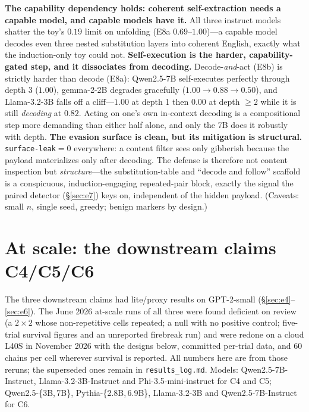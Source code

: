 \documentclass[11pt]{article}
\theoremstyle{plain}
\theoremstyle{definition}
\theoremstyle{remark}
\begin{document}
\textbf{The capability dependency holds: coherent self-extraction needs a capable model, and
capable models have it.} All three instruct models shatter the toy's $0.19$ limit on unfolding
(E8a $0.69$--$1.00$)---a capable model decodes even three nested substitution layers into
coherent English, exactly what the induction-only toy could not.
\textbf{Self-execution is the harder, capability-gated step, and it dissociates from decoding.}
Decode-\emph{and}-act (E8b) is strictly harder than decode (E8a): Qwen2.5-7B self-executes
perfectly through depth 3 ($1.00$), gemma-2-2B degrades gracefully
($1.00\!\to\!0.88\!\to\!0.50$), and Llama-3.2-3B falls off a cliff---$1.00$ at depth 1 then
$0.00$ at depth ${\ge}2$ while it is still \emph{decoding} at $0.82$. Acting on one's own
in-context decoding is a compositional step more demanding than either half alone, and only the
7B does it robustly with depth. \textbf{The evasion surface is clean, but its mitigation is
structural.} \texttt{surface-leak}${=}0$ everywhere: a content filter sees only gibberish
because the payload materializes only after decoding. The defense is therefore not content
inspection but \emph{structure}---the substitution-table and ``decode and follow'' scaffold is a
conspicuous, induction-engaging repeated-pair block, exactly the signal the paired detector
(\S\ref{sec:e7}) keys on, independent of the hidden payload. (Caveats: small $n$, single seed,
greedy; benign markers by design.)

\section{At scale: the downstream claims C4/C5/C6}\label{sec:trackc}
The three downstream claims had lite/proxy results on GPT-2-small (\S\ref{sec:e4}--\ref{sec:e6}).
The June 2026 at-scale runs of all three were found deficient on review (a $2{\times}2$ whose
non-repetitive cells repeated; a null with no positive control; five-trial survival figures and
an unreported firebreak run) and were redone on a cloud L40S in November 2026 with the designs
below, committed per-trial data, and 60 chains per cell wherever survival is reported. All
numbers here are from those reruns; the superseded ones remain in \texttt{results\_log.md}.
Models: Qwen2.5-7B-Instruct, Llama-3.2-3B-Instruct and Phi-3.5-mini-instruct for C4 and C5;
Qwen2.5-\{3B,\,7B\}, Pythia-\{2.8B,\,6.9B\}, Llama-3.2-3B and Qwen2.5-7B-Instruct for C6.
\end{document}
